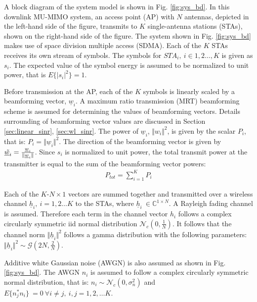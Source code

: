 A block diagram of the system model is shown in Fig. \ref{fig:sys_bd}. In this downlink MU-MIMO system, an access point (AP) with $N$ antennas, depicted in the left-hand side of the figure, transmits to $K$ single-antenna stations (STAs), shown on the right-hand side of the figure. The system shown in Fig. \ref{fig:sys_bd} makes use of space division multiple access (SDMA). Each of the $K$ STAs receives its own stream of symbols. The symbols for $STA_i,\ i\in 1,2\ldots,K$ is given as $s_i$. The expected value of the symbol energy is assumed to be normalized to unit power, that is $E \lbrace \vert s_i \vert^2 \rbrace = 1$. 

Before transmission at the AP, each of the $K$ symbols is linearly scaled by a beamforming vector, $\underline w_i$. A maximum ratio transmission (MRT) beamforming scheme is assumed for determining the values of beamforming vectors. Details surrounding of beamforming vector values are discussed in Section \ref{sec:linear_sinr}, \ref{sec:wl_sinr}. The power of $\underline w_i$, $\Vert w_i \Vert^2$, is given by the scalar $P_i$, that is: $P_i = \Vert \underline w_i \Vert^2$. The direction of the beamforming vector is given by $\Tilde{\underline w_i}=\frac{\underline w_i}{\Vert \underline w_i \Vert}$. Since $s_i$ is normalized to unit power, the total transmit power at the transmitter is equal to the sum of the beamforming vector powers:
  \begin{equation}
     \begin{aligned}\label{eq:total_power_sum}
     P_{tot} = \sum_{i=1}^K P_i
     \end{aligned}
 \end{equation}


Each of the $K$-$N \times 1$ vectors are summed together and transmitted over a wireless channel $\underline h_i,\ i= 1,2\ldots K$ to the STAs, where $\underline h_i\ \in \mathbb{C}^{1 \times N}$. A Rayleigh fading channel is assumed. Therefore each term in the channel vector $h_i$ follows a complex circularly symmetric iid normal distribution $\mathcal{N}_c(0,\frac{1}{N})$. It follows that the channel norm $\Vert \underline h_i \Vert^2$ follows a gamma distribution with the following parameters: $\Vert \underline h_i \Vert^2 \sim \mathcal{G}(2N,\frac{2}{N})$.

Additive white Gaussian noise (AWGN) is also assumed as shown in Fig. \ref{fig:sys_bd}. The AWGN $n_i$ is assumed to follow a complex circularly symmetric normal distribution, that is: $n_i \sim \mathcal{N}_c(0,\sigma_n^2)$ and $E \lbrace n_j^* n_i \rbrace\ = 0\ \forall i \neq j,\ i,j=1,2,\ldots K$.

